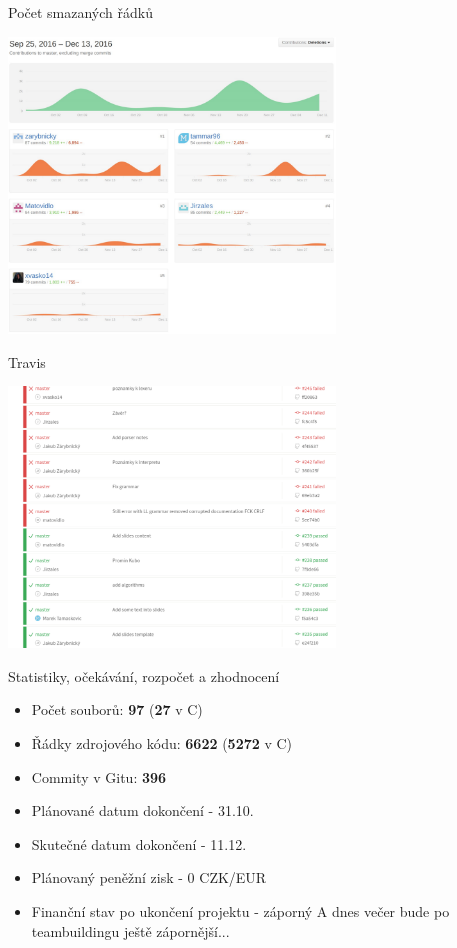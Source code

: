 \documentclass[13pt]{beamer}
\begin{document}
\begin{frame}{Počet smazaných řádků}
  \begin{center}
    \includegraphics[width=0.65\textwidth]{./img/git_del.pdf}
  \end{center}
\end{frame}

\begin{frame}{Travis}
  \begin{center}
    \includegraphics[width=0.65\textwidth]{./img/travis.pdf}
  \end{center}
\end{frame}

\begin{frame}{Statistiky, očekávání, rozpočet a zhodnocení}
\begin{itemize}
\item Počet souborů: \textbf{97} (\textbf{27} v C)
\item Řádky zdrojového kódu: \textbf{6622} (\textbf{5272} v C)
\item Commity v Gitu: \textbf{396}
\end{itemize}

\begin{itemize}
\item Plánované datum dokončení - 31.10.
\item Skutečné datum dokončení - 11.12.
\item Plánovaný peněžní zisk - 0 CZK/EUR
\item Finanční stav po ukončení projektu - záporný
\note[item] A dnes večer bude po teambuildingu ještě zápornější...
\end{itemize}

\end{frame}
\end{document}
